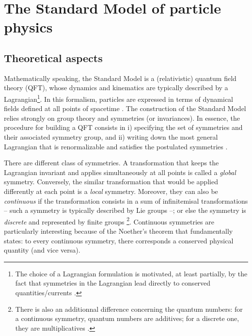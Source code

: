 \section{The Standard Model of particle physics}
\label{sec:StdModel}

\subsection{Theoretical aspects}
\label{subsec:Theory}

Mathematically speaking, the Standard Model is a (relativistic) quantum field theory (QFT), whose dynamics and kinematics are typically described by a Lagrangian\footnote{The choice of a Lagrangian formulation is motivated, at least partially, by the fact that symmetries in the Lagrangian lead directly to conserved quantities/currents \cite{kochAspectsChiralSymmetry1997}.}. In this formalism, particles are expressed in terms of dynamical fields defined at all points of spacetime \cite{peskinIntroductionQuantumField2018}. The construction of the Standard Model relies strongly on group theory and symmetries (or invariances). In essence, the procedure for building a QFT consists in i) specifying the set of symmetries and their associated symmetry group, and ii) writing down the most general Lagrangian that is renormalizable and satisfies the postulated symmetries \cite{braibantParticlesFundamentalInteractions2012}.

There are different class of symmetries. A transformation that keeps the Lagrangian invariant and applies simultaneously at all points is called a \textit{global} symmetry. Conversely, the similar transformation that would be applied differently at each point is a \textit{local} symmetry. Moreover, they can also be \textit{continuous} if the transformation consists in a sum of infinitemisal transformations -- such a symmetry is typically described by Lie groups --; or else the symmetry is \textit{discrete} and represented by finite groups \cite{peskinIntroductionQuantumField2018}\footnote{There is also an additionnal difference concerning the quantum numbers: for a continuous symmetry, quantum numbers are additives; for a discrete one, they are multiplicatives \cite{braibantParticlesFundamentalInteractions2012}.}. Continuous symmetries are particularly interesting because of the Noether's theorem \cite{noetherInvariantVariationProblems1971} that fundamentally states: to every continuous symmetry, there corresponds a conserved physical quantity (and vice versa).\\

